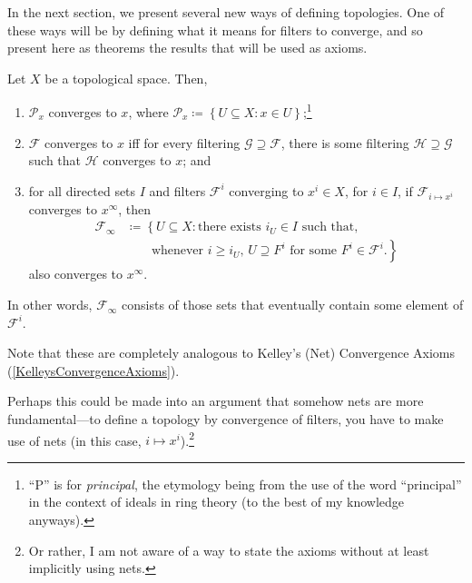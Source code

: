 In the next section, we present several new ways of defining topologies.  One of these ways will be by defining what it means for filters to converge, and so present here as theorems the results that will be used as axioms.
\begin{prp}\label{KelleysFilterConvergenceAxioms}
\begin{savenotes}
Let $X$ be a topological space.  Then,
\begin{enumerate}
\item \label{enmKelleysFilterConvergenceAxioms.i}$\mathcal{P}_x$ converges to $x$, where $\mathcal{P}_x\coloneqq \left\{ U\subseteq X:x\in U\right\}$;\footnote{``P'' is for \emph{principal}, the etymology being from the use of the word ``principal'' in the context of ideals in ring theory (to the best of my knowledge anyways).}
\item \label{enmKelleysFilterConvergenceAxioms.ii}$\mathcal{F}$ converges to $x$ iff for every filtering $\mathcal{G}\supseteq \mathcal{F}$, there is some filtering $\mathcal{H}\supseteq \mathcal{G}$ such that $\mathcal{H}$ converges to $x$; and
\item \label{enmKelleysFilterConvergenceAxioms.iii}for all directed sets $I$ and filters $\mathcal{F}^i$ converging to $x^i\in X$, for $i\in I$, if $\mathcal{F}_{i\mapsto x^i}$ converges to $x^\infty$, then
\begin{equation}
\begin{split}
\mathcal{F}_\infty & \coloneqq \left\{ U\subseteq X:\text{there exists }i_U\in I\text{ such that,}\right. \\
& \qquad \left. \text{whenever }i\geq i_U\text{, }U\supseteq F^i\text{ for some }F^i\in \mathcal{F}^i.\right\}
\end{split}
\end{equation}
also converges to $x^\infty$.
\end{enumerate}
\begin{rmk}
In other words, $\mathcal{F}_{\infty}$ consists of those sets that eventually contain some element of $\mathcal{F}^i$.
\end{rmk}
\begin{rmk}
Note that these are completely analogous to Kelley's (Net) Convergence Axioms (\cref{KelleysConvergenceAxioms}).
\end{rmk}
\begin{rmk}
Perhaps this could be made into an argument that somehow nets are more fundamental---to define a topology by convergence of filters, you have to make use of nets (in this case, $i\mapsto x^i$).\footnote{Or rather, I am not aware of a way to state the axioms without at least implicitly using nets.}

\end{rmk}
\end{savenotes}
\end{prp}
